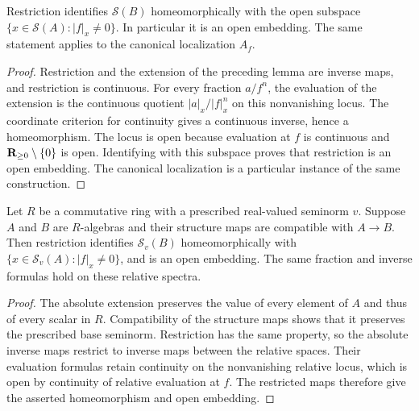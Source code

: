 \begin{theorem}\label{spectrum:principal-open}
\leanok
{}
Restriction identifies $\mathcal S(B)$ homeomorphically with the open subspace
$\{x\in\mathcal S(A):|f|_x\ne0\}$. In particular it is an open embedding.
The same statement applies to the canonical localization $A_f$.
\end{theorem}
\begin{proof}
Restriction and the extension of the preceding lemma are inverse maps, and
restriction is continuous. For every fraction $a/f^n$, the evaluation of the
extension is the continuous quotient $|a|_x/|f|_x^n$ on this nonvanishing locus.
The coordinate criterion for continuity gives a continuous inverse, hence a
homeomorphism. The locus is open because evaluation at $f$ is continuous and
$\mathbf{R}_{\ge0}\setminus\{0\}$ is open. Identifying with this subspace proves
that restriction is an open embedding. The canonical localization is a
particular instance of the same construction.
\end{proof}

\begin{theorem}\label{spectrum:relative-principal-open}
\leanok
{}
Let $R$ be a commutative ring with a prescribed real-valued seminorm $v$.
Suppose $A$ and $B$ are $R$-algebras and their structure maps are compatible
with $A\to B$. Then restriction identifies $\mathcal S_v(B)$ homeomorphically
with $\{x\in\mathcal S_v(A):|f|_x\ne0\}$, and is an open embedding.
The same fraction and inverse formulas hold on these relative spectra.
\end{theorem}
\begin{proof}
The absolute extension preserves the value of every element of $A$ and thus
of every scalar in $R$. Compatibility of the structure maps shows that it
preserves the prescribed base seminorm. Restriction has the same property,
so the absolute inverse maps restrict to inverse maps between the relative
spaces. Their evaluation formulas retain continuity on the nonvanishing
relative locus, which is open by continuity of relative evaluation at $f$.
The restricted maps therefore give the asserted homeomorphism and open embedding.
\end{proof}

